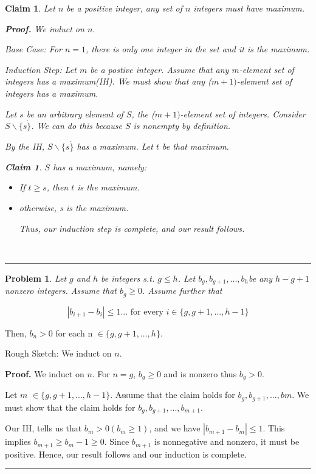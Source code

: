 \documentclass{article}
\newtheorem{claim}[theorem]{Claim}
\newtheorem{problem}[theorem]{Problem}
\newenvironment{proof}[1][Proof]{\noindent\textbf{#1.} }{\ \rule{0.5em}{0.5em}}
\begin{document}
\begin{claim}
Let $n$ be a positive integer, any set of $n$ integers must have maximum.

\begin{proof}
We induct on $n.$

Base Case: For $n=1$, there is only one integer in the set and it is the
maximum.

Induction Step: Let $m$ be a postive integer. Assume that any $m$-element
set of integers has a maximum(IH). We must show that any ($m+1)$-element set
of integers has a maximum.

Let $s$ be an arbitrary element of $S$, the ($m+1)$-element set of integers.
Consider $S\backslash \{s\dot{\}}$. We can do this because $S$ is nonempty
by definition.

By the IH, $S\backslash \{s\dot{\}}$ has a maximum. Let $t$ be that maximum.

\begin{claim}
$S$ has a maximum, namely:

\begin{itemize}
\item If $t\geq s$, then $t$ is the maximum.

\item otherwise, s is the maximum.

Thus, our induction step is complete, and our result follows.
\end{itemize}
\end{claim}
\end{proof}
\end{claim}

\begin{problem}
Let $g$ and $h$ be integers s.t. $g\leq h$. Let $b_{g},b_{g+1},...,b_{h}$be
any $h-g+1$ nonzero integers. Assume that $b_{g}\geq 0$. Assume further that

\begin{equation*}
|b_{i+1}-b_{i}|\leq 1...\text{ for every }i\in \{g,g+1,...,h-1\}
\end{equation*}
\end{problem}

Then, $b_{n}>0$ for each n $\in \{g,g+1,...,h\}$.

Rough Sketch: We induct on $n$.

\bigskip

\begin{proof}
We induct on $n$. For $n=g$, $b_{g}\geq 0$ and is nonzero thus $b_{g}>0$.

Let $m$ $\in \{g,g+1,...,h-1\}$. Assume that the claim holds for $%
b_{g},b_{g+1},...,bm$. We must show that the claim holds for $%
b_{g},b_{g+1},...,b_{m+1}$.

Our IH, tells us that $b_{m}>0(b_{m}\geq 1)$, and we have $%
|b_{m+1}-b_{m}|\leq 1$. This implies $b_{m+1}\geq b_{m}-1\geq 0$. Since $%
b_{m+1}$ is nonnegative and nonzero, it must be positive. Hence, our result
follows and our induction is complete.
\end{proof}
\end{document}

